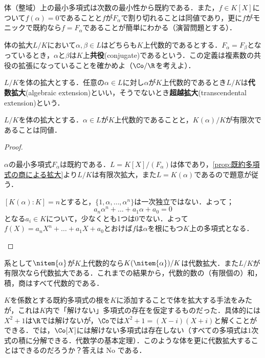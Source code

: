 体（整域）上の最小多項式は次数の最小性から既約である．また，$f\in K[X]$について$f(\alpha)=0$であることと$f$が$F_\alpha$で割り切れることは同値であり，更に$f$がモニックで既約なら$f=F_\alpha$であることが簡単にわかる（演習問題とする）．

体の拡大$L/K$において$\alpha,\beta\in L$はどちらも$K$上代数的であるとする．$F_\alpha=F_\beta$となっているとき，$\alpha$と$\beta$は$K$上\textbf{共役}(conjugate)であるという．この定義は複素数の共役の拡張になっていることを確かめよ（$\Co/\R$を考えよ）．


\begin{defi}
	$L/K$を体の拡大とする．任意の$\alpha\in L$に対し$\alpha$が$K$上代数的であるとき$L/K$は\textbf{代数拡大}(algebraic extension)といい，そうでないとき\textbf{超越拡大}(transcendental extension)という．
\end{defi}

\begin{prop}
	$L/K$を体の拡大とする．$\alpha\in L$が$K$上代数的であることと，$K(\alpha)/K$が有限次であることは同値．
\end{prop}

\begin{proof}
	\begin{eqv}
		\item $\alpha$の最小多項式$F_\alpha$は既約である．$L=K[X]/(F_\alpha)$は体であり，\ref{prop:既約多項式の商による拡大}より$L/K$は有限次拡大，また$L=K(\alpha)$であるので題意が従う．
		
		\item $[K(\alpha):K]=n$とすると，$\{1,\alpha,\dots,\alpha^n\}$は一次独立ではない．よって；
		\[a_n\alpha^n+\dots+a_1\alpha+a_0=0\]
		となる$a_i\in K$について，少なくとも1つは0でない．よって$f(X)=a_nX^n+\dots+a_1X+a_0$とおけば$f$は$\alpha$を根にもつ$K$上の多項式となる．
	\end{eqv}
\end{proof}

系として$\nitem{\alpha}$が$K$上代数的なら$K(\nitem{\alpha})/K$は代数拡大．また$L/K$が有限次なら代数拡大である．これまでの結果から，代数的数の（有限個の）和，積，商はすべて代数的である．

$K$を係数とする既約多項式の根を$K$に添加することで体を拡大する手法をみたが，これは$K$内で「解けない」多項式の存在を仮定するものだった．具体的には$X^2+1$は$\R$では解けないが，$\Co$では$X^2+1=(X-i)(X+i)$と解くことができる．では，$\Co[X]$には解けない多項式は存在しない（すべての多項式は$1$次式の積に分解できる．代数学の基本定理）．このような体を更に代数拡大することはできるのだろうか？答えは No である．

